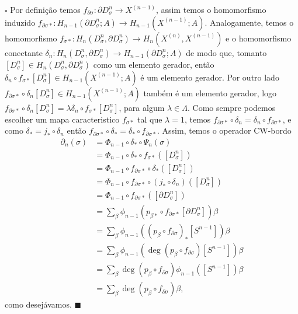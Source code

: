 \documentclass[12pt]{book}
\newenvironment{prova}[1]{$\square$ #1}{\hfill$\blacksquare$}
\newcommand{\celula}[2]{D^{#1}_{#2}}
\newcommand{\celulabordo}[2]{\partial D^{#1}_{#2}}
\newcommand{\homologia}[2]{H_{#1}(#2;A)}
\newcommand{\homologiarelcel}[3]{H_{#1}(D^{#2}_{#3}, \partial D^{#2}_{#3})}
\newcommand{\homologiarelskelesimpl}[2]{H_{#1}(X^{(#2)}, X^{(#2-1)})}
\newcommand{\skeleton}[1]{X^{(#1)}}
\begin{document}
\begin{prova}
		Por definição temos $f_{\partial\sigma}: \celulabordo{n}{\sigma} \to \skeleton{n-1}$, assim temos o homomorfismo induzido $f_{\partial\sigma*}: \homologia{n-1}{\celulabordo{n}{\sigma} }\to \homologia{n-1}{\skeleton{n-1}}$. Analogamente, temos o homomorfismo $f_{\sigma*}:\homologiarelcel{n}{n}{\sigma} \to \homologiarelskelesimpl{n}{n}$ e o homomorfismo conectante $\delta_{n} : \homologiarelcel{n}{n}{\sigma} \to \homologia{n-1}{\celulabordo{n}{\sigma}}$ de modo que, tomanto $[\celula{n}{\sigma}] \in \homologiarelcel{n}{n}{\sigma}$ como um elemento gerador, então $\delta_{n}\circ f_{\sigma*}[\celula{n}{\sigma}] \in \homologia{n-1}{\skeleton{n-1}}$ é um elemento gerador. Por outro lado $f_{\partial\sigma*}\circ \delta_{n}[\celula{n}{\sigma}] \in \homologia{n-1}{\skeleton{n-1}}$ também é um elemento gerador, logo $f_{\partial\sigma*}\circ \delta_{n}[\celula{n}{\sigma}] = \lambda \delta_{n}\circ f_{\sigma*}[\celula{n}{\sigma}]$, para algum $\lambda \in \Lambda$. Como sempre podemos escolher um mapa caracteristico $f_{\sigma *}$ tal que $\lambda = 1$, temos $f_{\partial\sigma*}\circ \delta_{n} = \delta_{n}\circ f_{\partial\sigma*}$, e como $\delta_{*} = j_{*}\circ\delta_{n}$ então $f_{\partial\sigma*}\circ \delta_{*} = \delta_{*}\circ f_{\partial\sigma*}$. Assim, temos o operador CW-bordo
		$$
		\begin{aligned}
		\partial_{n}(\sigma) &= \Phi_{n-1}\circ\delta_{*}\circ\Psi_{n}(\sigma)
		\\
		&= \Phi_{n-1}\circ\delta_{*}\circ f_{\sigma*}([\celula{n}{\sigma}])
		\\
		&= \Phi_{n-1}\circ f_{\partial\sigma*}\circ\delta_{*}([\celula{n}{\sigma}])
		\\
		&= \Phi_{n-1}\circ f_{\partial\sigma*}\circ (j_{*}\circ \delta_{n}) ([\celula{n}{\sigma}])
		\\
		&= \Phi_{n-1} \circ f_{\partial\sigma*}([\celulabordo{n}{\sigma}])
		\\
		&= \sum_{\beta} \phi_{n-1}(p_{\beta*}\circ f_{\partial\sigma*}[\celulabordo{n}{\sigma}])\beta
		\\
		&= \sum_{\beta} \phi_{n-1}((p_{\beta}\circ f_{\partial\sigma})_{*}[S^{n-1}])\beta
		\\
		&= \sum_{\beta} \phi_{n-1}(\deg(p_{\beta}\circ f_{\partial\sigma})[S^{n-1}])\beta
		\\
		&= \sum_{\beta} \deg(p_{\beta}\circ f_{\partial\sigma})\phi_{n-1}([S^{n-1}])\beta
		\\
		&= \sum_{\beta} \deg(p_{\beta}\circ f_{\partial\sigma})\beta,
		\end{aligned}
		$$
		como desejávamos.
	\end{prova}
	
\end{document}
